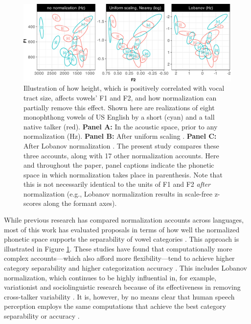 \documentclass[preprint]{JASA}
\begin{document}
\begin{figure}[!ht]

{\centering \includegraphics[width=0.95\linewidth]{./Figure1} 

}

\caption{Illustration of how height, which is positively correlated with vocal tract size, affects vowels' F1 and F2, and how normalization can partially remove this effect. Shown here are realizations of eight monophthong vowels of US English by a short (cyan) and a tall native talker (red). \textbf{Panel A:} In the acoustic space, prior to any normalization (Hz). \textbf{Panel B:} After uniform scaling \citep{nearey1978}. \textbf{Panel C:} After Lobanov normalization \citep{lobanov1971}. The present study compares these three accounts, along with 17 other normalization accounts. Here and throughout the paper, panel captions indicate the phonetic space in which normalization takes place in parenthesis. Note that this is not necessarily identical to the units of F1 and F2 \emph{after} normalization (e.g., Lobanov normalization results in scale-free z-scores along the formant axes).}\label{fig:two-talkers}
\end{figure}

While previous research has compared normalization accounts across languages, most of this work has evaluated proposals in terms of how well the normalized phonetic space supports the separability of vowel categories \citep{adank2004, carpenter-govindarajan1993, cole2010, escudero-bion2007, johnson-sjerps2021, syrdal1985}. This approach is illustrated in Figure \ref{fig:two-talkers}. These studies have found that computationally more complex accounts---which also afford more flexibility---tend to achieve higher category separability and higher categorization accuracy \citep[for review, see][]{persson-jaeger2023}. This includes Lobanov normalization, which continues to be highly influential in, for example, variationist and sociolinguistic research because of its effectiveness in removing cross-talker variability \citep[for a critique, see][]{barreda2021}. It is, however, by no means clear that human speech perception employs the same computations that achieve the best category separability or accuracy \citep[see also discussion in][]{barreda2021, nearey-assmann2007}.
\end{document}
